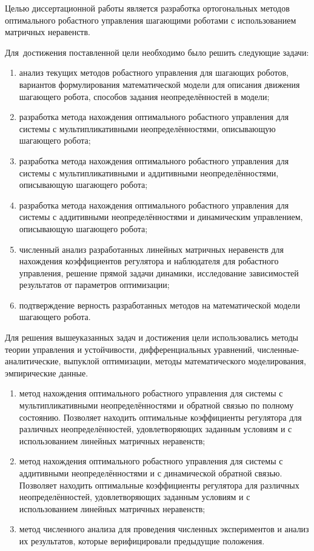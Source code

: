 {\aimtasks} 

Целью диссертационной работы является разработка ортогональных методов оптимального робастного управления шагающими роботами с использованием матричных неравенств.

Для~достижения поставленной цели необходимо было решить следующие задачи:
\begin{enumerate}[beginpenalty=10000] %
	\item анализ текущих методов робастного управления для шагающих роботов, вариантов формулирования математической модели для описания движения шагающего робота, способов задания неопределённостей в модели;
	\item разработка метода нахождения оптимального робастного управления для системы с мультипликативными неопределённостями, описывающую шагающего робота;
	\item разработка метода нахождения оптимального робастного управления для системы с мультипликативными и аддитивными неопределённостями, описывающую шагающего робота;
	\item разработка метода нахождения оптимального робастного управления для системы с аддитивными неопределённостями и динамическим управлением, описывающую шагающего робота;
	\item численный анализ разработанных линейных матричных неравенств для нахождения коэффициентов регулятора и наблюдателя для робастного управления, решение прямой задачи динамики, исследование зависимостей результатов от параметров оптимизации;
	\item подтверждение верность разработанных методов на математической модели шагающего робота.
\end{enumerate}

{\methods} 

Для решения вышеуказанных задач и достижения цели использовались методы теории управления и устойчивости, дифференциальных уравнений, численные-аналитические, выпуклой оптимизации, методы математического моделирования, эмпирические данные.

{}

\begin{enumerate}[beginpenalty=10000] %
	\item метод нахождения оптимального робастного управления для системы с мультипликативными неопределённостями и обратной связью по полному состоянию. Позволяет находить оптимальные коэффициенты регулятора для различных неопределённостей, удовлетворяющих заданным условиям и с использованием линейных матричных неравенств; 
	\item метод нахождения оптимального робастного управления для системы с аддитивными неопределённостями и с динамической обратной связью. Позволяет находить оптимальные коэффициенты регулятора для различных неопределённостей, удовлетворяющих заданным условиям и с использованием линейных матричных неравенств; 
	\item метод численного анализа для проведения численных экспериментов и анализ их результатов, которые верифицировали предыдущие положения.
\end{enumerate}

